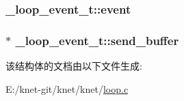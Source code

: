 \subsubsection[{event}]{ \+\_\+loop\+\_\+event\+\_\+t\+::event}\label{a00031_a76dd6f9dca6bec4527fbe55184812a70_a76dd6f9dca6bec4527fbe55184812a70}
\hypertarget{a00031_a0660974e7b88bb3715f6a61eae8c9721_a0660974e7b88bb3715f6a61eae8c9721}{}
\subsubsection[{send\+\_\+buffer}]{$\ast$ \+\_\+loop\+\_\+event\+\_\+t\+::send\+\_\+buffer}\label{a00031_a0660974e7b88bb3715f6a61eae8c9721_a0660974e7b88bb3715f6a61eae8c9721}


该结构体的文档由以下文件生成\+:\begin{DoxyCompactItemize}
\item 
E\+:/knet-\/git/knet/knet/\hyperlink{a00071}{loop.\+c}\end{DoxyCompactItemize}
